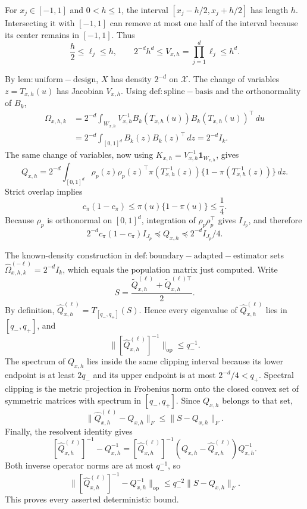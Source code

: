 For \(x_j\in[-1,1]\) and \(0<h\le1\), the interval \([x_j-h/2,x_j+h/2]\) has length \(h\). Intersecting it with \([-1,1]\) can remove at most one half of the interval because its center remains in \([-1,1]\). Thus
\[
\frac h2\le\ell_j\le h,
\qquad
2^{-d}h^d\le V_{x,h}=\prod_{j=1}^d\ell_j\le h^d.
\]

By \(\mathrm{lem:uniform-design}\), \(X\) has density \(2^{-d}\) on \(\mathcal X\). The change of variables \(z=T_{x,h}(u)\) has Jacobian \(V_{x,h}\). Using \(\mathrm{def:spline-basis}\) and the orthonormality of \(B_k\),
\[
\begin{aligned}
\Omega_{x,h,k}
&=2^{-d}\int_{W_{x,h}}V_{x,h}^{-1}
B_k(T_{x,h}(u))B_k(T_{x,h}(u))^\top\,du\\
&=2^{-d}\int_{[0,1]^d}B_k(z)B_k(z)^\top\,dz
=2^{-d}I_k.
\end{aligned}
\]
The same change of variables, now using \(K_{x,h}=V_{x,h}^{-1}\mathbf 1_{W_{x,h}}\), gives
\[
Q_{x,h}=2^{-d}\int_{[0,1]^d}
\rho_p(z)\rho_p(z)^\top
\pi(T_{x,h}^{-1}(z))\{1-\pi(T_{x,h}^{-1}(z))\}\,dz.
\]
Strict overlap implies
\[
c_\pi(1-c_\pi)\le\pi(u)\{1-\pi(u)\}\le\frac14.
\]
Because \(\rho_p\) is orthonormal on \([0,1]^d\), integration of \(\rho_p\rho_p^\top\) gives \(I_{J_p}\), and therefore
\[
2^{-d}c_\pi(1-c_\pi)I_{J_p}
\preceq Q_{x,h}
\preceq2^{-d}I_{J_p}/4.
\]

The known-density construction in \(\mathrm{def:boundary-adapted-estimator}\) sets \(\widehat\Omega^{(-\ell)}_{x,h,k}=2^{-d}I_k\), which equals the population matrix just computed. Write
\[
S=\frac{\widetilde Q^{(\ell)}_{x,h}+\widetilde Q^{(\ell)\top}_{x,h}}2.
\]
By definition, \(\widehat Q^{(\ell)}_{x,h}=T_{[q_-,q_+]}(S)\). Hence every eigenvalue of \(\widehat Q^{(\ell)}_{x,h}\) lies in \([q_-,q_+]\), and
\[
\|[\widehat Q^{(\ell)}_{x,h}]^{-1}\|_{\mathrm{op}}\le q_-^{-1}.
\]
The spectrum of \(Q_{x,h}\) lies inside the same clipping interval because its lower endpoint is at least \(2q_-\) and its upper endpoint is at most \(2^{-d}/4<q_+\). Spectral clipping is the metric projection in Frobenius norm onto the closed convex set of symmetric matrices with spectrum in \([q_-,q_+]\). Since \(Q_{x,h}\) belongs to that set,
\[
\|\widehat Q^{(\ell)}_{x,h}-Q_{x,h}\|_F
\le\|S-Q_{x,h}\|_F.
\]
Finally, the resolvent identity gives
\[
[\widehat Q^{(\ell)}_{x,h}]^{-1}-Q_{x,h}^{-1}
=[\widehat Q^{(\ell)}_{x,h}]^{-1}
(Q_{x,h}-\widehat Q^{(\ell)}_{x,h})Q_{x,h}^{-1}.
\]
Both inverse operator norms are at most \(q_-^{-1}\), so
\[
\|[\widehat Q^{(\ell)}_{x,h}]^{-1}-Q_{x,h}^{-1}\|_{\mathrm{op}}
\le q_-^{-2}\|S-Q_{x,h}\|_F.
\]
This proves every asserted deterministic bound.